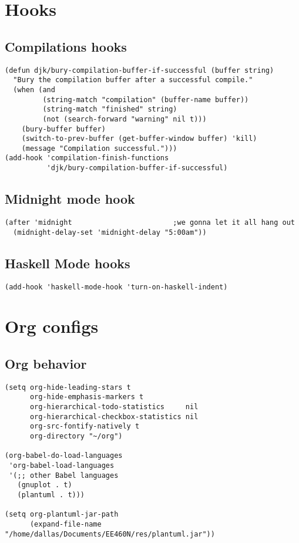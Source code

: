 \documentclass[11pt]{article}
\begin{document}
\section{Hooks}
\label{sec-9}
\subsection{Compilations hooks}
\label{sec-9-1}


\begin{verbatim}
(defun djk/bury-compilation-buffer-if-successful (buffer string)
  "Bury the compilation buffer after a successful compile."
  (when (and
         (string-match "compilation" (buffer-name buffer))
         (string-match "finished" string)
         (not (search-forward "warning" nil t)))
    (bury-buffer buffer)
    (switch-to-prev-buffer (get-buffer-window buffer) 'kill)
    (message "Compilation successful.")))
(add-hook 'compilation-finish-functions
          'djk/bury-compilation-buffer-if-successful)
\end{verbatim}
\subsection{Midnight mode hook}
\label{sec-9-2}


\begin{verbatim}
(after 'midnight                        ;we gonna let it all hang out
  (midnight-delay-set 'midnight-delay "5:00am"))
\end{verbatim}
\subsection{Haskell Mode hooks}
\label{sec-9-3}


\begin{verbatim}
(add-hook 'haskell-mode-hook 'turn-on-haskell-indent)
\end{verbatim}
\section{Org configs}
\label{sec-10}
\subsection{Org behavior}
\label{sec-10-1}


\begin{verbatim}
(setq org-hide-leading-stars t
      org-hide-emphasis-markers t
      org-hierarchical-todo-statistics     nil
      org-hierarchical-checkbox-statistics nil
      org-src-fontify-natively t
      org-directory "~/org") 

(org-babel-do-load-languages
 'org-babel-load-languages
 '(;; other Babel languages
   (gnuplot . t)
   (plantuml . t))) 

(setq org-plantuml-jar-path
      (expand-file-name "/home/dallas/Documents/EE460N/res/plantuml.jar"))
\end{verbatim}
\end{document}
